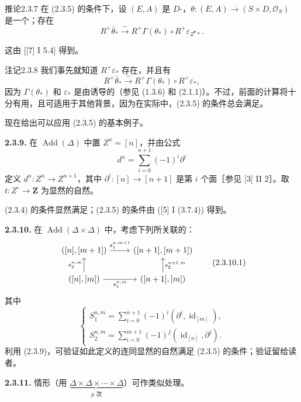 \begin{SGAresult}{推论}{2.3.7}
在 (2.3.5) 的条件下，设 $(E,A)$ 是 $D$-，$\theta:(E,A)\to(S\times D,\mathcal O_S)$ 是一个；存在
\[
R^+\bar\theta_*\xrightarrow{\sim}R^+\Gamma(\theta_*)\circ R^+\varepsilon_{Z^\bullet*}.
\]
\end{SGAresult}
这由 [[7] I 5.4] 得到。

\begin{SGAresult}{注记}{2.3.8}
我们事先就知道 $R^+\varepsilon_*$ 存在，并且有
\[
R^+\bar\theta_*\xrightarrow{\sim}R^+\Gamma(\theta_*)\circ R^+\varepsilon_*,
\]
因为 $\Gamma(\theta_*)$ 和 $\varepsilon_*$ 是由诱导的（参见 (1.3.6) 和 (2.1.1)）。不过，前面的计算将十分有用，且可适用于其他背景，因为在实际中，(2.3.5) 的条件总会满足。
\end{SGAresult}
现在给出可以应用 (2.3.5) 的基本例子。

\textbf{2.3.9.} 在 $\operatorname{Add}(\Delta)$ 中置 $Z^n=[n]$，并由公式
\[
d^n=\sum_{i=0}^{n+1}(-1)^i\partial^i \tag{2.3.9.1}
\]
定义 $d^n:Z^n\to Z^{n+1}$，其中 $\partial^i:[n]\to[n+1]$ 是第 $i$ 个面［参见 [3] II 2］。取 $t:Z^\circ\to\mathbf Z$ 为显然的自然。

(2.3.4) 的条件显然满足；(2.3.5) 的条件由 ([5] I (3.7.4)) 得到。

\textbf{2.3.10.} 在 $\operatorname{Add}(\Delta\times\Delta)$ 中，考虑下列所关联的：
\[
\begin{tikzcd}
([n],[m+1])\arrow[r,"{s_1^{n,m+1}}"]&([n+1],[m+1])\\
([n],[m])\arrow[u,"{s_2^{n,m}}"]\arrow[r,"{s_1^{n,m}}"']&([n+1],[m])\arrow[u,"{s_2^{n+1,m}}"']
\end{tikzcd}\tag{2.3.10.1}
\]
其中
\[
\begin{cases}
S_1^{n,m}=\displaystyle\sum_{i=0}^{n+1}(-1)^i(\partial^i,\operatorname{id}_{[m]}),\\[5pt]
S_2^{n,m}=\displaystyle\sum_{i=0}^{m+1}(-1)^j(\operatorname{id}_{[n]},\partial^j).
\end{cases}\tag{2.3.10.2}
\]
利用 (2.3.9)，可验证如此定义的连同显然的自然满足 (2.3.5) 的条件；验证留给读者。

\textbf{2.3.11.} 情形（用 $\underbrace{\Delta\times\Delta\times\cdots\times\Delta}_{p\text{ 次}}$）可作类似处理。

